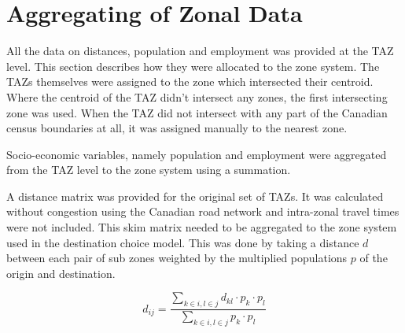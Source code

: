\section{Aggregating of Zonal Data}
All the data on distances, population and employment was provided at the TAZ level. This section describes how they were allocated to the zone system. The TAZs themselves were assigned to the zone which intersected their centroid. Where the centroid of the TAZ didn't intersect any zones, the first intersecting zone was used. When the TAZ did not intersect with any part of the Canadian census boundaries at all, it was assigned manually to the nearest zone.

Socio-economic variables, namely population and employment were aggregated from the TAZ level to the zone system using a summation.

A distance matrix was provided for the original set of TAZs. It was calculated without congestion using the Canadian road network and intra-zonal travel times were not included. This skim matrix needed to be aggregated to the zone system used in the destination choice model. This was done by taking a distance $d$ between each pair of sub zones weighted by the multiplied populations $p$ of the origin and destination.

$$ d_{ij} = 
\frac{
\sum_{k \in i, l \in j} d_{kl} \cdot p_k \cdot p_l}
{
\sum_{k \in i, l \in j} p_k \cdot p_l
} 
$$

